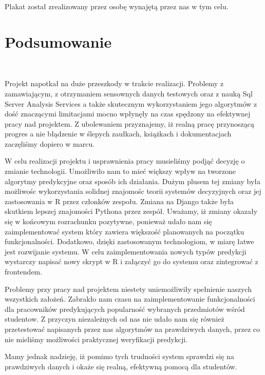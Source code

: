 \documentclass[licencjacka]{pracamgr}
\begin{document}
Plakat został zrealizowany przez osobę wynajętą przez nas w tym celu.

\chapter{Podsumowanie} ~\\ \indent


Projekt napotkał na duże przeszkody w trakcie realizacji. Problemy z zamawiającym, z otrzymaniem sensownych danych testowych oraz z nauką Sql Server Analysis Services a także skutecznym wykorzystaniem jego algorytmów z dość znaczącymi limitacjami mocno wpłynęły na czas spędzony na efektywnej pracy nad projektem. Z ubolewaniem przyznajemy, iż realną pracę przynoszącą progres a nie błądzenie w ślepych zaułkach, książkach i dokumentacjach zaczęliśmy dopiero w marcu.

W celu realizacji projektu i usprawnienia pracy musieliśmy podjąć decyzję o zmianie technologii. Umożliwiło nam to mieć większy wpływ na tworzone algorytmy predykcyjne oraz sposób ich działania. Dużym plusem tej zmiany była możliwośc wykorzystania solidnej znajomośc teorii systemów decyzyjnych oraz jej zastosowania w R przez członków zespołu. Zmiana na Django także była skutkiem lepszej znajomości Pythona przez zespół. Uważamy, iż zmiany okazały się w końcowym rozrachunku pozytywne, ponieważ udało nam się zaimplementować system który zawiera większość planowanych na początku funkcjonalności. Dodatkowo, dzięki zastosowanym technologiom, w miarę łatwe jest rozwijanie systemu. W celu zaimplementowania nowych typów predykcji wystarczy napisać nowy skrypt w R i załączyć go do systemu oraz zintegrować z frontendem.

Problemy przy pracy nad projektem niestety uniemożliwiły spełnienie naszych wszystkich założeń. Zabrakło nam czasu na zaimplementowanie funkcjonalności dla pracowników predykujących popularność wybranych przedmiotów wśród studentow. Z przyczyn niezależnych od nas nie udało nam się również przetestować napisanych przez nas algorytmów na prawdziwych danych, przez co nie mieliśmy możliwości praktycznej weryfikacji predykcji. 

Mamy jednak nadzieję, iż pomimo tych trudności system sprawdzi się na prawdziwych danych i okaże się realną, efektywną pomocą dla studentów.
\end{document}

